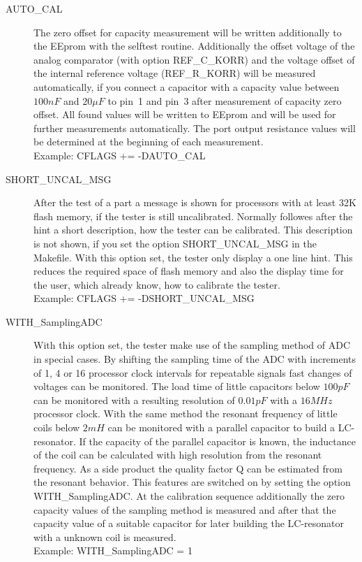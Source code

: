 \begin{description}
  \item[AUTO\_CAL] The zero offset for capacity measurement will be written additionally
to the EEprom with the selftest routine. Additionally the offset voltage of the analog comparator (with option REF\_C\_KORR) and the
voltage offset of the internal reference voltage (REF\_R\_KORR) will be measured automatically, if you connect a
capacitor with a capacity value between \(100nF\) and \(20\mu F\) to pin~1 and pin~3 after measurement of capacity zero offset. 
All found values will be written to EEprom and will be used for further measurements automatically.
The port output resistance values will be determined at the beginning of each measurement.\\
Example: CFLAGS += -DAUTO\_CAL

  \item[SHORT\_UNCAL\_MSG] After the test of a part a message is shown for processors with at least 32K flash memory,
if the tester is still uncalibrated. Normally followes after the hint a short description, how the
tester can be calibrated. This description is not shown, if you set the option SHORT\_UNCAL\_MSG in the Makefile.
With this option set, the tester only display a one line hint.
This reduces the required space of flash memory  and also the display time for the user,
which already know, how to calibrate the tester.\\
Example: CFLAGS += -DSHORT\_UNCAL\_MSG

  \item[WITH\_SamplingADC] With this option set, the tester make use of the sampling method of ADC in special cases.
By shifting the sampling time of the ADC with increments of 1, 4 or 16 processor clock intervals for repeatable signals
fast changes of voltages can be monitored.
The load time of little capacitors below \(100pF\) can be monitored with a resulting resolution of \(0.01pF\) with a \(16MHz\) processor clock.
With the same method the resonant frequency of little coils below \(2mH\) can be monitored with a parallel capacitor to build a LC-resonator.
If the capacity of the parallel capacitor is known, the inductance of the coil can be calculated with high resolution from
the resonant frequency. As a side product the quality factor Q can be estimated from the resonant behavior.
This features are switched on by setting the option WITH\_SamplingADC.
At the calibration sequence additionally the zero capacity values of the sampling method is measured and
after that the capacity value of a suitable capacitor for later building the LC-resonator with a unknown coil is measured.\\
Example: WITH\_SamplingADC = 1


\end{description}
